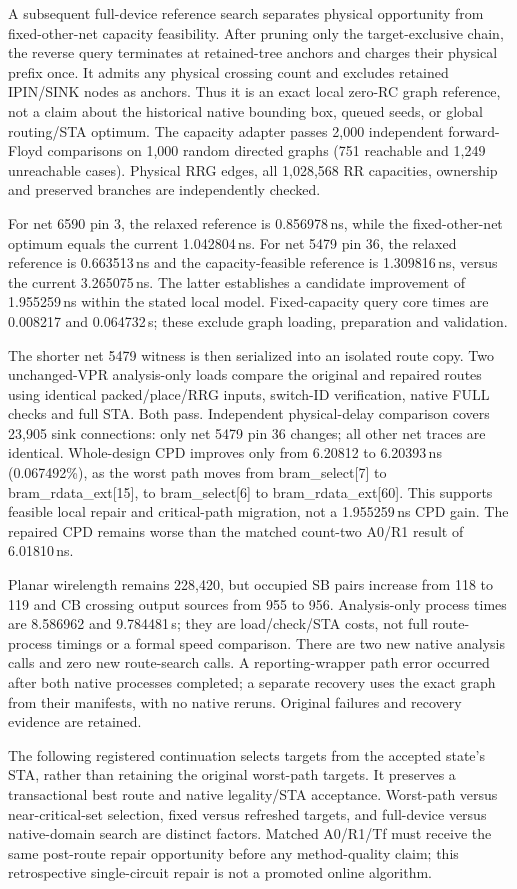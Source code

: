 A subsequent full-device reference search separates physical opportunity from fixed-other-net capacity feasibility. After pruning only the target-exclusive chain, the reverse query terminates at retained-tree anchors and charges their physical prefix once. It admits any physical crossing count and excludes retained IPIN/SINK nodes as anchors. Thus it is an exact local zero-RC graph reference, not a claim about the historical native bounding box, queued seeds, or global routing/STA optimum. The capacity adapter passes 2,000 independent forward-Floyd comparisons on 1,000 random directed graphs (751 reachable and 1,249 unreachable cases). Physical RRG edges, all 1,028,568 RR capacities, ownership and preserved branches are independently checked.

For net 6590 pin 3, the relaxed reference is 0.856978\,ns, while the fixed-other-net optimum equals the current 1.042804\,ns. For net 5479 pin 36, the relaxed reference is 0.663513\,ns and the capacity-feasible reference is 1.309816\,ns, versus the current 3.265075\,ns. The latter establishes a candidate improvement of 1.955259\,ns within the stated local model. Fixed-capacity query core times are 0.008217 and 0.064732\,s; these exclude graph loading, preparation and validation.

The shorter net 5479 witness is then serialized into an isolated route copy. Two unchanged-VPR analysis-only loads compare the original and repaired routes using identical packed/place/RRG inputs, switch-ID verification, native FULL checks and full STA. Both pass. Independent physical-delay comparison covers 23,905 sink connections: only net 5479 pin 36 changes; all other net traces are identical. Whole-design CPD improves only from 6.20812 to 6.20393\,ns (0.067492\%), as the worst path moves from bram\_select[7] to bram\_rdata\_ext[15], to bram\_select[6] to bram\_rdata\_ext[60]. This supports feasible local repair and critical-path migration, not a 1.955259\,ns CPD gain. The repaired CPD remains worse than the matched count-two A0/R1 result of 6.01810\,ns.

Planar wirelength remains 228,420, but occupied SB pairs increase from 118 to 119 and CB crossing output sources from 955 to 956. Analysis-only process times are 8.586962 and 9.784481\,s; they are load/check/STA costs, not full route-process timings or a formal speed comparison. There are two new native analysis calls and zero new route-search calls. A reporting-wrapper path error occurred after both native processes completed; a separate recovery uses the exact graph from their manifests, with no native reruns. Original failures and recovery evidence are retained.

The following registered continuation selects targets from the accepted state's STA, rather than retaining the original worst-path targets. It preserves a transactional best route and native legality/STA acceptance. Worst-path versus near-critical-set selection, fixed versus refreshed targets, and full-device versus native-domain search are distinct factors. Matched A0/R1/Tf must receive the same post-route repair opportunity before any method-quality claim; this retrospective single-circuit repair is not a promoted online algorithm.
